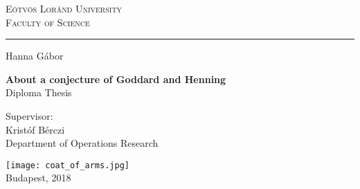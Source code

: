 \begin{titlepage}
  \begin{center}
    \textsc{
      \large
      Eötvös Loránd University \\
      Faculty of Science \\
    }
    \vspace{0.4cm}

    \rule{14cm}{0.4pt}
    \vspace*{1.2cm}

    \LARGE{Hanna Gábor}

    \huge
    \vspace{0.6cm}
    \textbf{About a conjecture of Goddard and Henning} \\
    \vspace{0.3cm}
    \normalsize
    Diploma Thesis \\
    \vspace{1.5cm}

    \large
    Supervisor: \\
    \vspace{0.3cm}
    Kristóf Bérczi \\
    Department of Operations Research

    \vfill
    \texttt{[image: coat\_of\_arms.jpg]} \\
    \vspace{0.1cm}
    \normalsize
    Budapest, 2018
  \end{center}
\end{titlepage}
